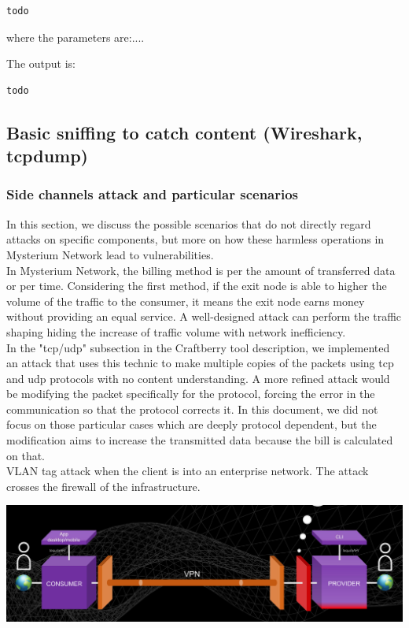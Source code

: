 \documentclass[12pt]{article}
\begin{document}
	\begin{lstlisting}[frame=single]
		todo
	\end{lstlisting}

	where the parameters are:....

	The output is:\\
	
	\begin{lstlisting}[frame=single]
		todo
	\end{lstlisting}
	
	
	\subsection{Basic sniffing to catch content (Wireshark, tcpdump)}

	\subsubsection{Side channels attack and particular scenarios}
	In this section, we discuss the possible scenarios that do not directly regard attacks on specific components, but more on how these harmless operations in Mysterium Network lead to vulnerabilities.\\
	In Mysterium Network, the billing method is per the amount of transferred data or per time. Considering the first method, if the exit node is able to higher the volume of the traffic to the consumer, it means the exit node earns money without providing an equal service. A well-designed attack can perform the traffic shaping hiding the increase of traffic volume with network inefficiency.\\
	In the "tcp/udp" subsection in the Craftberry tool description, we implemented an attack that uses this technic to make multiple copies of the packets using tcp and udp protocols with no content understanding. A more refined attack would be modifying the packet specifically for the protocol, forcing the error in the communication so that the protocol corrects it. In this document, we did not focus on those particular cases which are deeply protocol dependent, but the modification aims to increase the transmitted data because the bill is calculated on that.\\
	
	VLAN tag attack when the client is into an enterprise network. The attack crosses the firewall of the infrastructure.

	\includegraphics[width=\linewidth]{images/client_server_vpn_connection.png}
\end{document}
